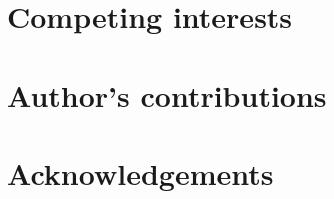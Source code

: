 \documentclass[twocolumn]{bmcart}%
\begin{document}
\begin{backmatter}

\section*{Competing interests}

\section*{Author's contributions}

\section*{Acknowledgements}





\end{backmatter}
\end{document}
